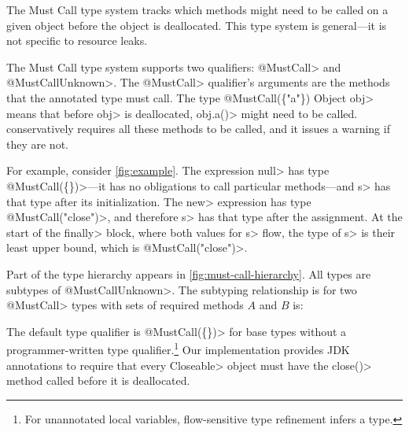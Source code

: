 The Must Call type system tracks
which methods might need to be called on
a given object before the object is deallocated.
This type system is general---it is not specific
to resource leaks.


The Must Call type system supports two qualifiers: \<@MustCall> and
\<@MustCallUnknown>. The \<@MustCall> qualifier's arguments are the
methods that the annotated type must call. The type
\<@MustCall(\{"a"\}) Object obj> means that before \<obj> is
deallocated, \<obj.a()> might need to be called.
\Tool conservatively requires all these methods to be called,
and it issues a warning if they are not.

For example, consider \cref{fig:example}. The expression \<null> has type
\<@MustCall(\{\})>---it has no obligations
to call particular methods---and \<s> has that type after its initialization.
The \<new> expression has type \<@MustCall("close")>, and therefore
\<s> has that type after the assignment.
At the start of the \<finally> block, where both values for \<s> flow,
the type of \<s> is their least upper bound, which is \<@MustCall("close")>.


Part of the type hierarchy appears in \cref{fig:must-call-hierarchy}.
All types are subtypes of \<@MustCallUnknown>.
The subtyping relationship is for two \<@MustCall> types with sets
of required methods $A$ and $B$ is:

The default type qualifier is \<@MustCall(\{\})> for base types without a
programmer-written type qualifier.\footnote{For unannotated local variables,
  flow-sensitive type refinement infers a type.}
Our implementation
provides JDK annotations to require that every 
\<Closeable> object must have the \<close()> method called before
it is deallocated.

